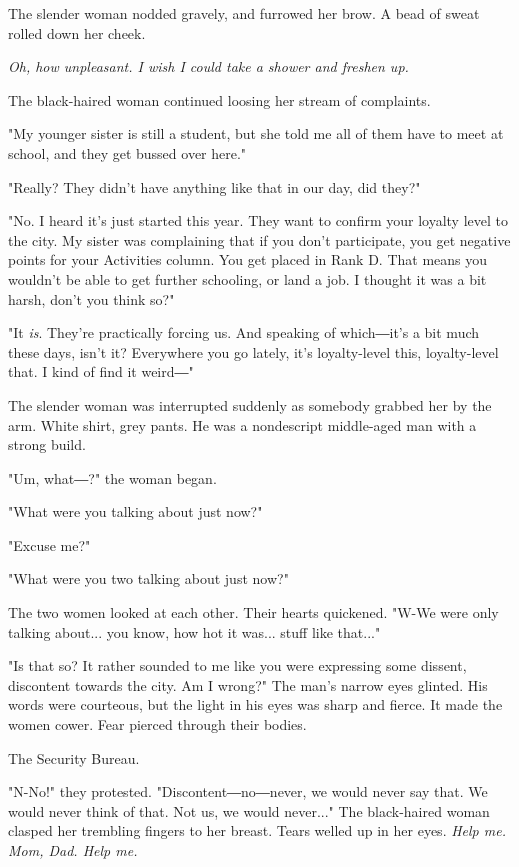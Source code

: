 The slender woman nodded gravely, and furrowed her brow. A bead of sweat
rolled down her cheek.

\emph{Oh, how unpleasant. I wish I could take a shower and freshen up.}

The black-haired woman continued loosing her stream of complaints.

"My younger sister is still a student, but she told me all of them have
to meet at school, and they get bussed over here."

"Really? They didn't have anything like that in our day, did they?"

"No. I heard it's just started this year. They want to confirm your
loyalty level to the city. My sister was complaining that if you don't
participate, you get negative points for your Activities column. You get
placed in Rank D. That means you wouldn't be able to get further
schooling, or land a job. I thought it was a bit harsh, don't you think
so?"

"It \emph{is}. They're practically forcing us. And speaking of which―it's a bit
much these days, isn't it? Everywhere you go lately, it's loyalty-level
this, loyalty-level that. I kind of find it weird―"

The slender woman was interrupted suddenly as somebody grabbed her by
the arm. White shirt, grey pants. He was a nondescript middle-aged man
with a strong build.

"Um, what―?" the woman began.

"What were you talking about just now?"

"Excuse me?"

"What were you two talking about just now?"

The two women looked at each other. Their hearts quickened. "W-We were
only talking about... you know, how hot it was... stuff like that..."

"Is that so? It rather sounded to me like you were expressing some
dissent, discontent towards the city. Am I wrong?" The man's narrow eyes
glinted. His words were courteous, but the light in his eyes was sharp
and fierce. It made the women cower. Fear pierced through their bodies.

The Security Bureau.

"N-No!" they protested. "Discontent―no―never, we would never say that.
We would never think of that. Not us, we would never..." The
black-haired woman clasped her trembling fingers to her breast. Tears
welled up in her eyes. \emph{Help me. Mom, Dad. Help me.}

